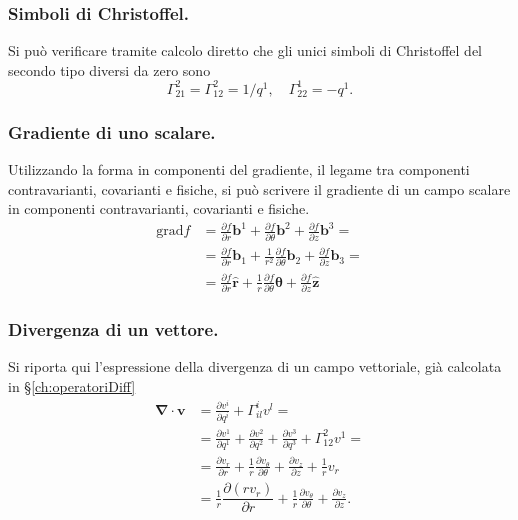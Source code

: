 \subsubsection{Simboli di Christoffel.}
 Si può verificare tramite calcolo diretto che gli unici simboli di Christoffel del secondo tipo diversi da zero sono
 \begin{equation}
  \Gamma_{21}^2 = \Gamma_{12}^2 = 1 / q^1  , \quad \Gamma_{22}^1 = -q^1 .
 \end{equation}
 
\subsubsection{Gradiente di uno scalare.}
 Utilizzando la forma in componenti del gradiente, il legame tra componenti contravarianti, covarianti e fisiche, si può
 scrivere il gradiente di un campo scalare in componenti contravarianti, covarianti e fisiche.
 \begin{equation}
 \begin{aligned}
  \text{grad} f & = \frac{\partial f}{\partial r} \bm{b}^1 + \frac{\partial f}{\partial \theta} \bm{b}^2 + \frac{\partial f}{\partial z} \bm{b}^3 = \\ 
      & = \frac{\partial f}{\partial r} \bm{b}_1 + \frac{1}{r^2}\frac{\partial f}{\partial \theta} \bm{b}_2 + \frac{\partial f}{\partial z} \bm{b}_3 = \\
      & = \frac{\partial f}{\partial r} \bm{\hat{r}} + \frac{1}{r}\frac{\partial f}{\partial \theta} \bm{\hat{\theta}}
         + \frac{\partial f}{\partial z} \bm{\hat{z}}
 \end{aligned}
 \end{equation}

\subsubsection{Divergenza di un vettore.}
 Si riporta qui l'espressione della divergenza di un campo vettoriale, già calcolata in \S\ref{ch:operatoriDiff}
 \begin{equation}
 \begin{aligned}
  \bm{\nabla} \cdot \bm{v} & = \frac{\partial v^i}{\partial q^i} + \Gamma_{il}^i v^l = \\
                    & = \frac{\partial v^1}{\partial q^1} + \frac{\partial v^2}{\partial q^2} + \frac{\partial v^3}{\partial q^3}
                       + \Gamma_{12}^2 v^1 = \\
                    & = \frac{\partial v_r}{\partial r} + \frac{1}{r}\frac{\partial v_\theta}{\partial \theta} + \frac{\partial v_z}{\partial z}
                       + \frac{1}{r} v_r \\
                    & = \frac{1}{r}\dfrac{\partial (r v_r)}{\partial r} + \frac{1}{r}\frac{\partial v_\theta}{\partial \theta} +
                        \frac{\partial v_z}{\partial z} .
 \end{aligned}
 \end{equation}
 
